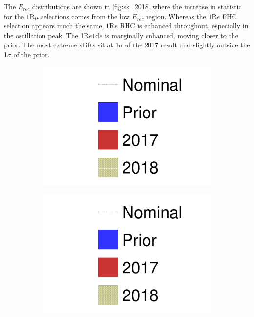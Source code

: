 The $E_{rec}$ distributions are shown in \autoref{fig:sk_2018} where the increase in statistic for the $1\text{R}\mu$ selections comes from the low $E_{rec}$ region. Whereas the $1\text{R}e$ FHC selection appears much the same, $1\text{R}e$ RHC is enhanced throughout, especially in the oscillation peak. The 1$\text{R}e1\text{d}e$ is marginally enhanced, moving closer to the prior. The most extreme shifts sit at $1\sigma$ of the 2017 result and slightly outside the 1$\sigma$ of the prior.
\begin{figure}[h]
	\begin{subfigure}[t]{0.32\textwidth}
		\includegraphics[width=\textwidth, trim={0mm 0mm 0mm 0mm}, clip, page=1]{figures/mach3/2018/data/prior_error_1june_try_2017_fit_on_sk_spectra_2018_results_test_spectra}
	\end{subfigure}
	\begin{subfigure}[t]{0.32\textwidth}
		\includegraphics[width=\textwidth, trim={0mm 0mm 0mm 0mm}, clip, page=5]{figures/mach3/2018/data/prior_error_1june_try_2017_fit_on_sk_spectra_2018_results_test_spectra}

\end{subfigure}
\end{figure}
